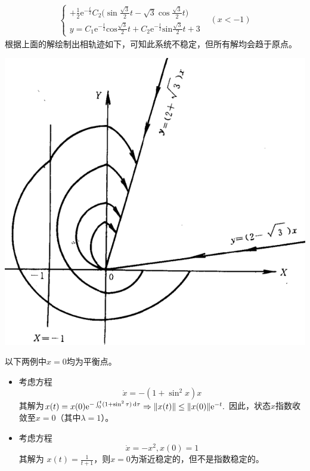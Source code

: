 \begin{example}[稳定与不稳定的图示]
\begin{itemize}[leftmargin=1em]
\begin{align*}
\begin{cases}
        +\frac12\mathrm{e}^{-\frac t2} C_2\Big(\sin\frac{\sqrt{3}}2t-\sqrt{3}\cos\frac{\sqrt{3}}2t\Big) \\
        y=C_{1}\mathrm{e}^{-\frac{t}{2}}\mathrm{cos}\frac{\sqrt{3}}{2}t+C_{2}\mathrm{e}^{-\frac{t}{2}}\mathrm{sin}\frac{\sqrt{3}}{2}t+3 \end{cases}&(x<-1)
    \end{align*}
    根据上面的解绘制出相轨迹如下，可知此系统不稳定，但所有解均会趋于原点。
    \begin{center}
      \includegraphics[width=0.4\linewidth]{figure/nonlinear/unstable2.png}
    \end{center}
  \end{itemize}
\end{example}

\begin{example}[稳定与不稳定的计算例]
  以下两例中$x=0$均为平衡点。\begin{itemize}[leftmargin=1em]
    \item 考虑方程$$\dot{x}=-(1+\sin^2x)x$$
其解为$x(t)=x(0)\mathrm{e}^{-\int_{0}^{t}(1+\sin^{2}\tau)\mathop{}\!\mathrm{d}\tau}\Rightarrow\|x(t)\|\leq\|x(0)\|\mathrm{e}^{-t}.$
因此，状态$x$指数收敛至$x=0$（其中$\lambda=1$）。
\item 考虑方程$$\dot{x}=-x^2,x(0)=1$$
其解为 $x(t)=\frac1{t+1}$，则$x=0$为渐近稳定的，但不是指数稳定的。
  \end{itemize}
\end{example}
